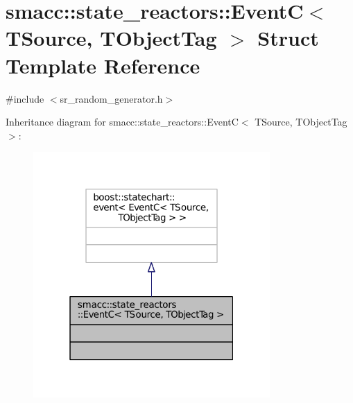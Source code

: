 \hypertarget{structsmacc_1_1state__reactors_1_1EventC}{}\section{smacc\+:\+:state\+\_\+reactors\+:\+:EventC$<$ T\+Source, T\+Object\+Tag $>$ Struct Template Reference}
\label{structsmacc_1_1state__reactors_1_1EventC}


{\ttfamily \#include $<$sr\+\_\+random\+\_\+generator.\+h$>$}



Inheritance diagram for smacc\+:\+:state\+\_\+reactors\+:\+:EventC$<$ T\+Source, T\+Object\+Tag $>$\+:
\nopagebreak
\begin{figure}[H]
\begin{center}
\leavevmode
\includegraphics[width=256pt]{structsmacc_1_1state__reactors_1_1EventC__inherit__graph}
\end{center}
\end{figure}


